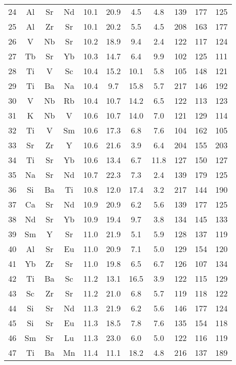 \begin{center}
\begin{xtabular}{c|ccc|cccc|ccc}
 24 &  Al &  Sr &  Nd &  10.1 &  20.9 & 4.5 & 4.8 & 139 & 177 & 125 \\
 25 &  Al &  Zr &  Sr &  10.1 &  20.2 & 5.5 & 4.5 & 208 & 163 & 177 \\
 26 &   V &  Nb &  Sr &  10.2 &  18.9 & 9.4 & 2.4 & 122 & 117 & 124 \\
 27 &  Tb &  Sr &  Yb &  10.3 &  14.7 & 6.4 & 9.9 & 102 & 125 & 111 \\
 28 &  Ti &   V &  Sc &  10.4 &  15.2 &  10.1 & 5.8 & 105 & 148 & 121 \\
 29 &  Ti &  Ba &  Na &  10.4 & 9.7 &  15.8 & 5.7 & 217 & 146 & 192 \\
 30 &   V &  Nb &  Rb &  10.4 &  10.7 &  14.2 & 6.5 & 122 & 113 & 123 \\
 31 &   K &  Nb &   V &  10.6 &  10.7 &  14.0 & 7.0 & 121 & 129 & 114 \\
 32 &  Ti &   V &  Sm &  10.6 &  17.3 & 6.8 & 7.6 & 104 & 162 & 105 \\
 33 &  Sr &  Zr &   Y &  10.6 &  21.6 & 3.9 & 6.4 & 204 & 155 & 203 \\
 34 &  Ti &  Sr &  Yb &  10.6 &  13.4 & 6.7 &  11.8 & 127 & 150 & 127 \\
 35 &  Na &  Sr &  Nd &  10.7 &  22.3 & 7.3 & 2.4 & 139 & 179 & 125 \\
 36 &  Si &  Ba &  Ti &  10.8 &  12.0 &  17.4 & 3.2 & 217 & 144 & 190 \\
 37 &  Ca &  Sr &  Nd &  10.9 &  20.9 & 6.2 & 5.6 & 139 & 177 & 125 \\
 38 &  Nd &  Sr &  Yb &  10.9 &  19.4 & 9.7 & 3.8 & 134 & 145 & 133 \\
 39 &  Sm &   Y &  Sr &  11.0 &  21.9 & 5.1 & 5.9 & 128 & 137 & 119 \\
 40 &  Al &  Sr &  Eu &  11.0 &  20.9 & 7.1 & 5.0 & 129 & 154 & 120 \\
 41 &  Yb &  Zr &  Sr &  11.0 &  19.8 & 6.5 & 6.7 & 126 & 107 & 134 \\
 42 &  Ti &  Ba &  Sc &  11.2 &  13.1 &  16.5 & 3.9 & 122 & 115 & 129 \\
 43 &  Sc &  Zr &  Sr &  11.2 &  21.0 & 6.8 & 5.7 & 119 & 118 & 122 \\
 44 &  Si &  Sr &  Nd &  11.3 &  21.9 & 6.2 & 5.6 & 146 & 177 & 124 \\
 45 &  Si &  Sr &  Eu &  11.3 &  18.5 & 7.8 & 7.6 & 135 & 154 & 118 \\
 46 &  Sm &  Sr &  Lu &  11.3 &  23.0 & 6.0 & 5.0 & 122 & 116 & 119 \\
 47 &  Ti &  Ba &  Mn &  11.4 &  11.1 &  18.2 & 4.8 & 216 & 137 & 189 \\

\end{xtabular}
\end{center}
